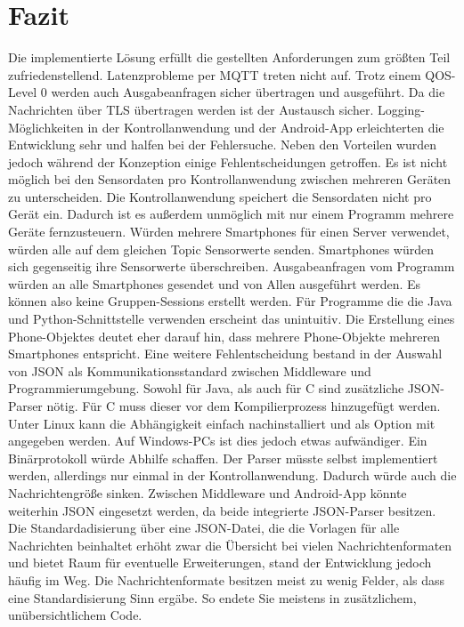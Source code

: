 \documentclass[11pt,a4paper]{report}
\begin{document}
\chapter{Fazit}\label{chap:fazit}
Die implementierte Lösung erfüllt die gestellten Anforderungen zum größten Teil zufriedenstellend.
Latenzprobleme per MQTT treten nicht auf.
Trotz einem QOS-Level 0 werden auch Ausgabeanfragen sicher übertragen und ausgeführt.
Da die Nachrichten über TLS übertragen werden ist der Austausch sicher.
Logging-Möglichkeiten in der Kontrollanwendung und der Android-App erleichterten die Entwicklung sehr und halfen bei der Fehlersuche.
Neben den Vorteilen wurden jedoch während der Konzeption einige Fehlentscheidungen getroffen.
Es ist nicht möglich bei den Sensordaten pro Kontrollanwendung zwischen mehreren Geräten zu unterscheiden.
Die Kontrollanwendung speichert die Sensordaten nicht pro Gerät ein.
Dadurch ist es außerdem unmöglich mit nur einem Programm mehrere Geräte fernzusteuern.
Würden mehrere Smartphones für einen Server verwendet, würden alle auf dem gleichen Topic Sensorwerte senden.
Smartphones würden sich gegenseitig ihre Sensorwerte überschreiben.
Ausgabeanfragen vom Programm würden an alle Smartphones gesendet und von Allen ausgeführt werden.
Es können also keine Gruppen-Sessions erstellt werden.
Für Programme die die Java und Python-Schnittstelle verwenden erscheint das unintuitiv.
Die Erstellung eines Phone-Objektes deutet eher darauf hin, dass mehrere Phone-Objekte mehreren Smartphones entspricht.
Eine weitere Fehlentscheidung bestand in der Auswahl von JSON als Kommunikationsstandard zwischen Middleware und Programmierumgebung.
Sowohl für Java, als auch für C sind zusätzliche JSON-Parser nötig.
Für C muss dieser vor dem Kompilierprozess hinzugefügt werden.
Unter Linux kann die Abhängigkeit einfach nachinstalliert und als Option mit angegeben werden.
Auf Windows-PCs ist dies jedoch etwas aufwändiger.
Ein Binärprotokoll würde Abhilfe schaffen.
Der Parser müsste selbst implementiert werden, allerdings nur einmal in der Kontrollanwendung.
Dadurch würde auch die Nachrichtengröße sinken.
Zwischen Middleware und Android-App könnte weiterhin JSON eingesetzt werden, da beide integrierte JSON-Parser besitzen.
Die Standardadisierung über eine JSON-Datei, die die Vorlagen für alle Nachrichten beinhaltet erhöht zwar die Übersicht bei vielen Nachrichtenformaten und bietet Raum für eventuelle Erweiterungen, stand der Entwicklung jedoch häufig im Weg.
Die Nachrichtenformate besitzen meist zu wenig Felder, als dass eine Standardisierung Sinn ergäbe.
So endete Sie meistens in zusätzlichem, unübersichtlichem Code.
\end{document}
